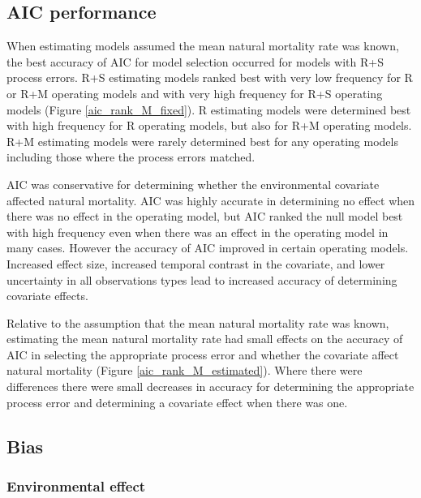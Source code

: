 \documentclass[
  12pt,
]{article}
\begin{document}
\hypertarget{aic-performance}{%
\subsection*{AIC performance}\label{aic-performance}}

When estimating models assumed the mean natural mortality rate was known, the best accuracy of AIC for model selection occurred for models with R+S process errors. R+S estimating models ranked best with very low frequency for R or R+M operating models and with very high frequency for R+S operating models (Figure \ref{aic_rank_M_fixed}). R estimating models were determined best with high frequency for R operating models, but also for R+M operating models. R+M estimating models were rarely determined best for any operating models including those where the process errors matched.

AIC was conservative for determining whether the environmental covariate affected natural mortality. AIC was highly accurate in determining no effect when there was no effect in the operating model, but AIC ranked the null model best with high frequency even when there was an effect in the operating model in many cases. However the accuracy of AIC improved in certain operating models. Increased effect size, increased temporal contrast in the covariate, and lower uncertainty in all observations types lead to increased accuracy of determining covariate effects.

Relative to the assumption that the mean natural mortality rate was known, estimating the mean natural mortality rate had small effects on the accuracy of AIC in selecting the appropriate process error and whether the covariate affect natural mortality (Figure \ref{aic_rank_M_estimated}). Where there were differences there were small decreases in accuracy for determining the appropriate process error and determining a covariate effect when there was one.

\hypertarget{bias-1}{%
\subsection*{Bias}\label{bias-1}}

\hypertarget{environmental-effect}{%
\subsubsection*{Environmental effect}\label{environmental-effect}}
\end{document}
